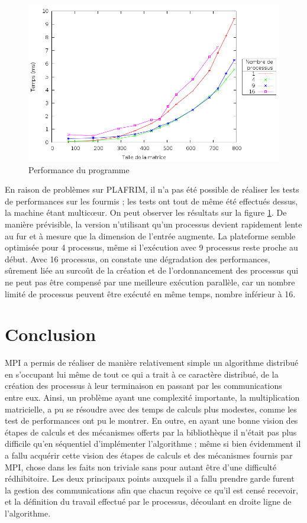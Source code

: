\documentclass[a4paper,11pt]{article}
\begin{document}
\begin{figure}[h!]
  \centering
  \includegraphics[width=\textwidth]{plot.png}
  \caption{Performance du programme}
  \label{perf}
\end{figure}

En raison de problèmes sur PLAFRIM, il n'a pas été possible de réaliser les tests de performances sur les fourmis ; les tests ont tout de même été effectués dessus, la machine étant multicœur. On peut observer les résultats sur la figure \ref{perf}. De manière prévisible, la version n'utilisant qu'un processus devient rapidement lente au fur et à mesure que la dimension de l'entrée augmente. La plateforme semble optimisée pour 4 processus, même si l'exécution avec 9 processus reste proche au début. Avec 16 processus, on constate une dégradation des performances, sûrement liée au surcoût de la création et de l'ordonnancement des processus qui ne peut pas être compensé par une meilleure exécution parallèle, car un nombre limité de processus peuvent être exécuté en même temps, nombre inférieur à 16.

\section{Conclusion}

MPI a permis de réaliser de manière relativement simple un algorithme distribué en s'occupant lui même de tout ce qui a trait à ce caractère distribué, de la création des processus à leur terminaison en passant par les communications entre eux. Ainsi, un problème ayant une complexité importante, la multiplication matricielle, a pu se résoudre avec des temps de calculs plus modestes, comme les test de performances ont pu le montrer. En outre, en ayant une bonne vision des étapes de calculs et des mécanismes offerts par la bibliothèque il n'était pas plus difficile qu'en séquentiel d'implémenter l'algorithme ; même si bien évidemment il a fallu acquérir cette vision des étapes de calculs et des mécanismes fournis par MPI, chose dans les faits non triviale sans pour autant être d'une difficulté rédhibitoire. Les deux principaux points auxquels il a fallu prendre garde furent la gestion des communications afin que chacun reçoive ce qu'il est censé recevoir, et la définition du travail effectué par le processus, découlant en droite ligne de l'algorithme.
\end{document}
